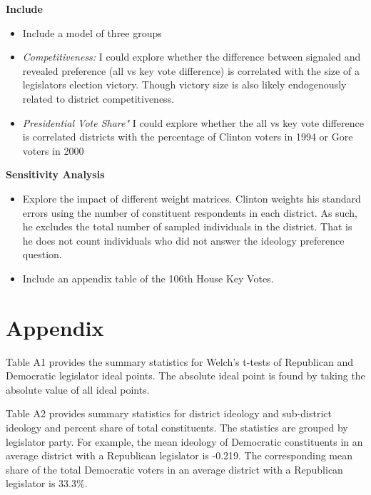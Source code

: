 \documentclass[10pt,letterpaper]{article}
\begin{document}
\textbf{Include}
\begin{itemize}
\item Include a model of three groups
\item \textit{Competitiveness:} I could explore whether the difference between signaled and revealed preference (all vs key vote difference) is correlated with the size of a legislators election victory. Though victory size is also likely endogenously related to district competitiveness.
\item \textit{Presidential Vote Share"} I could explore whether the 
all vs key vote difference is correlated districts with the percentage of Clinton voters in 1994 or Gore voters in 2000 
\end{itemize}

\textbf{Sensitivity Analysis}
\begin{itemize}
\item Explore the impact of different weight matrices. Clinton weights his standard errors using the number of constituent respondents in each district. As such, he excludes the total number of sampled individuals in the district. That is he does not count individuals who did not answer the ideology preference question. 
\item Include an appendix table of the 106th House Key Votes.
\end{itemize}



\newpage

\newpage



\newpage
\section{Appendix} 
\setcounter{table}{0}
\renewcommand{\thetable}{A\arabic{table}}
\setcounter{figure}{0}
\renewcommand{\thefigure}{A\arabic{figure}}

%
Table A1 provides the summary statistics for Welch's t-tests of Republican and Democratic legislator ideal points. The absolute ideal point is found by taking the absolute value of all ideal points.
 

Table A2 provides summary statistics for district ideology and sub-district ideology and percent share of total constituents. The statistics are grouped by legislator party. For example, the mean ideology of Democratic constituents in an average district with a Republican legislator is -0.219. The corresponding mean share of the total Democratic voters in an average district with a Republican legislator is 33.3\%.
 
\end{document}
